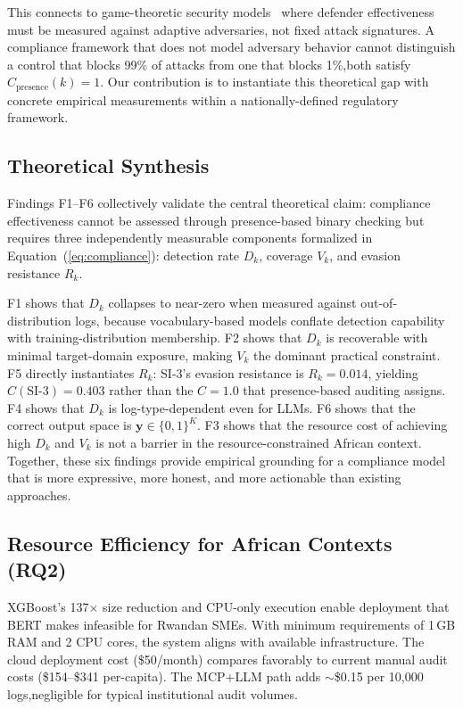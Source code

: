 \documentclass[futureinternet,article,submit,pdftex,moreauthors]{Definitions/mdpi}
\begin{document}
This connects to game-theoretic security models~\cite{mitre_attack_applications} where
defender effectiveness must be measured against adaptive adversaries, not fixed attack
signatures. A compliance framework that does not model adversary behavior cannot distinguish
a control that blocks 99\% of attacks from one that blocks 1\%,both satisfy
$C_{\text{presence}}(k) = 1$. Our contribution is to instantiate this theoretical gap with
concrete empirical measurements within a nationally-defined regulatory framework.

\subsection{Theoretical Synthesis}

Findings F1--F6 collectively validate the central theoretical claim: compliance effectiveness
cannot be assessed through presence-based binary checking but requires three independently
measurable components formalized in Equation~(\ref{eq:compliance}): detection rate $D_k$,
coverage $V_k$, and evasion resistance $R_k$.

F1 shows that $D_k$ collapses to near-zero when measured against out-of-distribution logs,
because vocabulary-based models conflate detection capability with training-distribution
membership. F2 shows that $D_k$ is recoverable with minimal target-domain exposure, making
$V_k$ the dominant practical constraint. F5 directly instantiates $R_k$: SI-3's evasion
resistance is $R_k = 0.014$, yielding $C(\text{SI-3}) = 0.403$ rather than the $C = 1.0$
that presence-based auditing assigns. F4 shows that $D_k$ is log-type-dependent even for
LLMs. F6 shows that the correct output space is $\mathbf{y} \in \{0,1\}^K$. F3 shows that
the resource cost of achieving high $D_k$ and $V_k$ is not a barrier in the
resource-constrained African context. Together, these six findings provide empirical grounding
for a compliance model that is more expressive, more honest, and more actionable than existing
approaches.

\subsection{Resource Efficiency for African Contexts (RQ2)}

XGBoost's 137$\times$ size reduction and CPU-only execution enable deployment that BERT
makes infeasible for Rwandan SMEs. With minimum requirements of 1\,GB RAM and 2 CPU cores,
the system aligns with available infrastructure. The cloud deployment cost (\$50/month)
compares favorably to current manual audit costs (\$154--\$341 per-capita). The MCP+LLM
path adds $\sim$\$0.15 per 10{,}000 logs,negligible for typical institutional audit volumes.
\end{document}

